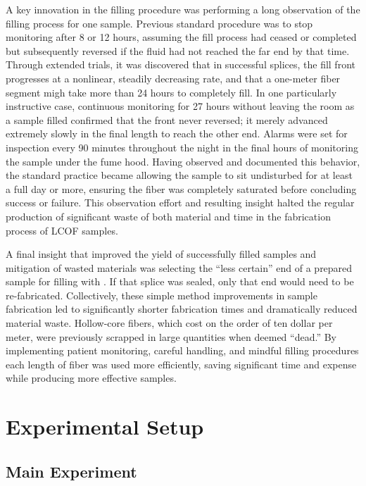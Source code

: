 A key innovation in the filling procedure was performing a long observation of the filling process for one sample. Previous standard procedure was to stop monitoring after 8 or 12 hours, assuming the fill process had ceased or completed but subsequently reversed if the fluid had not reached the far end by that time. Through extended trials, it was discovered that in successful splices, the fill front progresses at a nonlinear, steadily decreasing rate, and that a one-meter fiber segment migh take more than 24 hours to completely fill. In one particularly instructive case, continuous monitoring for 27 hours without leaving the room as a sample filled confirmed that the  front never reversed; it merely advanced extremely slowly in the final length to reach the other end. Alarms were set for inspection every 90 minutes throughout the night in the final hours of monitoring the sample under the fume hood. Having observed and documented this behavior, the standard practice became allowing the sample to sit undisturbed for at least a full day or more, ensuring the fiber was completely saturated before concluding success or failure. This observation effort and resulting insight halted the regular production of significant waste of both material and time in the fabrication process of \ac{LCOF} samples.

A final insight that improved the yield of successfully filled samples and mitigation of wasted materials was selecting the “less certain” end of a prepared sample for filling with . If that splice was sealed, only that end would need to be re-fabricated. Collectively, these simple method improvements in sample fabrication led to significantly shorter fabrication times and dramatically reduced material waste. Hollow-core fibers, which cost on the order of ten dollar per meter, were previously scrapped in large quantities when deemed “dead.” By implementing patient monitoring, careful handling, and mindful filling procedures each length of fiber was used more efficiently, saving significant time and expense while producing more effective samples.


\section{Experimental Setup}
\label{sec:Cooling:Setup}


\subsection{Main Experiment}
\label{subsec:Cooling:Setup:Main}


